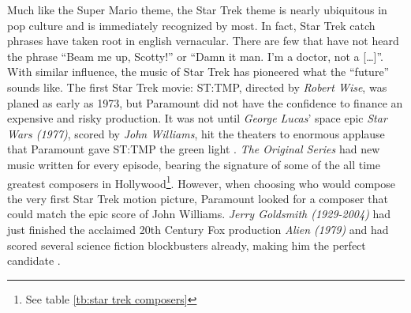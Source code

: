 Much like the Super Mario theme, the Star Trek theme is nearly ubiquitous in pop culture and is immediately recognized by most. In fact, Star Trek catch phrases have taken root in english vernacular. There are few that have not heard the phrase ``Beam me up, Scotty!'' or ``Damn it man. I'm a doctor, not a [\ldots]''. With similar influence, the music of Star Trek has pioneered what the ``future'' sounds like. The first Star Trek movie: \ac{ST:TMP}, directed by \textit{Robert Wise}, was planed as early as 1973, but Paramount did not have the confidence to finance an expensive and risky production. It was not until \textit{George Lucas}' space epic \textit{Star Wars (1977)}, scored by \textit{John Williams}, hit the theaters to enormous applause that Paramount gave \ac{ST:TMP} the green light \parencite{bond_music_1998}. \textit{The Original Series} had new music written for every episode, bearing the signature of some of the all time greatest composers in Hollywood\footnote{See table \ref{tb:star trek composers}}. However, when choosing who would compose the very first Star Trek motion picture, Paramount looked for a composer that could match the epic score of John Williams. \textit{Jerry Goldsmith (1929-2004)} had just finished the acclaimed 20th Century Fox production \textit{Alien (1979)} and had scored several science fiction blockbusters already, making him the perfect candidate \parencite[87]{bond_music_1998}. 

